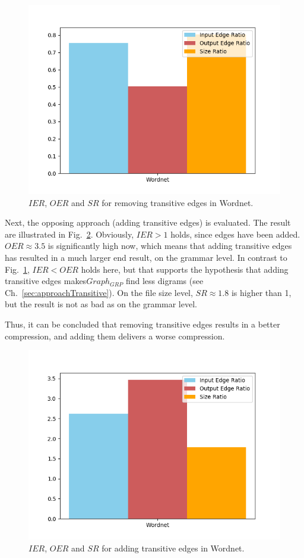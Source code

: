 \begin{figure}
	\centering
	\includegraphics[width=0.7\linewidth]{figures/4_evaluation/ontology/ratioTransitivesDelete}
	\caption{$IER$, $OER$ and $SR$ for removing transitive edges in Wordnet.}
	\label{fig:ratiotransitivesDelete}
\end{figure}

Next, the opposing approach (adding transitive edges) is evaluated. The result are illustrated in Fig.~\ref{fig:ratiotransitivesAdd}. Obviously, $ IER>1 $ holds, since edges have been added. $OER\approx3.5$ is significantly high now, which means that adding transitive edges has resulted in a much larger end result, on the grammar level. In contrast to Fig.~\ref{fig:ratiotransitivesDelete}, $IER<OER$ holds here, but that supports the hypothesis that adding transitive edges makes$Graph_{GRP}$ find less digrams (see Ch.~\ref{sec:approachTransitive}). On the file size level, $SR\approx1.8$ is higher than 1, but the result is not as bad as on the grammar level. 

Thus, it can be concluded that removing transitive edges results in a better compression, and adding them delivers a worse compression.

\begin{figure}
	\centering
	\includegraphics[width=0.7\linewidth]{figures/4_evaluation/ontology/ratioTransitivesAdd}
	\caption{$IER$, $OER$ and $SR$ for adding transitive edges in Wordnet.}
	\label{fig:ratiotransitivesAdd}
\end{figure}


